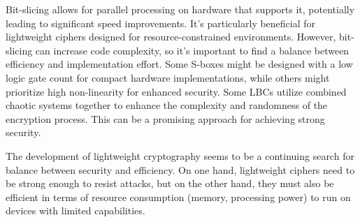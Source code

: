 \documentclass[conference]{IEEEtran}
\begin{document}
Bit-slicing allows for parallel processing on hardware that supports it, potentially leading to significant speed improvements. It's particularly beneficial for lightweight ciphers designed for resource-constrained environments. However, bit-slicing can increase code complexity, so it's important to find a balance between efficiency and implementation effort.
Some S-boxes might be designed with a low logic gate count for compact hardware implementations, while others might prioritize high non-linearity for enhanced security.
Some LBCs utilize combined chaotic systems together to enhance the complexity and randomness of the encryption process. This can be a promising approach for achieving strong security.

The development of lightweight cryptography seems to be a continuing search for balance between security and efficiency. On one hand, lightweight ciphers need to be strong enough to resist attacks, but on the other hand, they must also be efficient in terms of resource consumption (memory, processing power) to run on devices with limited capabilities.




\vspace{12pt}
\end{document}
